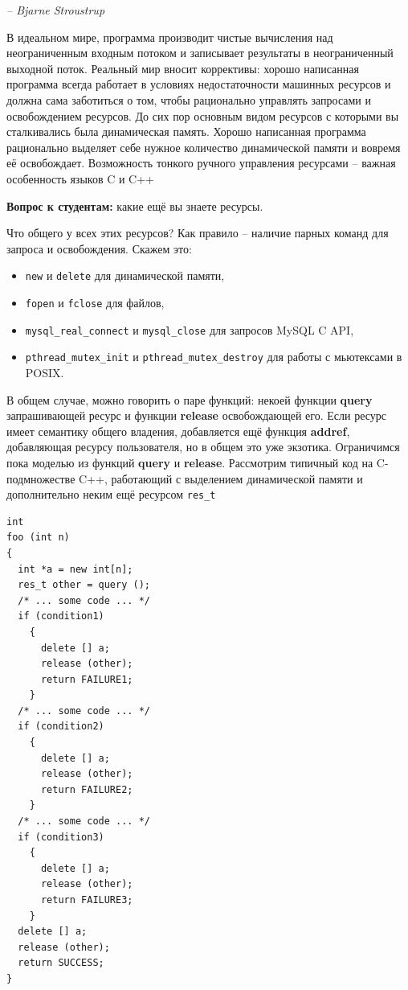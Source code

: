 \documentclass[a4paper,12pt,oneside]{article}
\newif\ifanswers
\begin{document}
\hfill\textit{-- Bjarne Stroustrup}

В идеальном мире, программа производит чистые вычисления над неограниченным входным потоком и записывает результаты в неограниченный выходной поток. Реальный мир вносит коррективы: хорошо написанная программа всегда работает в условиях недостаточности машинных ресурсов и должна сама заботиться о том, чтобы рационально управлять запросами и освобождением ресурсов. До сих пор основным видом ресурсов с которыми вы сталкивались была динамическая память. Хорошо написанная программа рационально выделяет себе нужное количество динамической памяти и вовремя её освобождает. Возможность тонкого ручного управления ресурсами -- важная особенность языков C и C++

\textbf{Вопрос к студентам:} какие ещё вы знаете ресурсы.

\ifanswers
Ожидаемые ответы: файловые дескрипторы, мьютексы, шрифты и кисти, объекты гуя, соединения с бд, сокеты.
\fi

Что общего у всех этих ресурсов? Как правило -- наличие парных команд для запроса и освобождения. 
Скажем это: 
\begin{itemize}
\item
\lstinline!new! и \lstinline!delete! для динамической памяти, 
\item
\lstinline!fopen! и \lstinline!fclose! для файлов, 
\item
\lstinline!mysql_real_connect! и \lstinline!mysql_close! для запросов MySQL C API, 
\item
\lstinline!pthread_mutex_init! и \lstinline!pthread_mutex_destroy! для работы с мьютексами в POSIX. 
\end{itemize}

В общем случае, можно говорить о паре функций: некоей функции \textbf{query} запрашивающей ресурс и функции \textbf{release} освобождающей его. Если ресурс имеет семантику общего владения, добавляется ещё функция \textbf{addref}, добавляющая ресурсу пользователя, но в общем это уже экзотика. Ограничимся пока моделью из функций \textbf{query} и \textbf{release}. Рассмотрим типичный код на C-подмножестве C++, работающий с выделением динамической памяти и дополнительно неким ещё ресурсом \lstinline!res_t!

\begin{lstlisting}
int
foo (int n)
{
  int *a = new int[n];
  res_t other = query ();
  /* ... some code ... */
  if (condition1)
    {
      delete [] a;
      release (other);
      return FAILURE1;      
    }
  /* ... some code ... */
  if (condition2)
    {
      delete [] a;
      release (other);
      return FAILURE2; 
    }
  /* ... some code ... */
  if (condition3)
    {
      delete [] a;
      release (other);
      return FAILURE3;
    }
  delete [] a;
  release (other);
  return SUCCESS;
}

\end{lstlisting}
\end{document}
